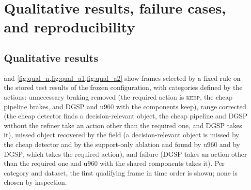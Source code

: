 \documentclass[10pt,letterpaper]{article}
\newcommand{\method}{DGSP\xspace}
\theoremstyle{remark}
\theoremstyle{plain}
\theoremstyle{definition}
\begin{document}
\section{Qualitative results, failure cases, and reproducibility}
\label{sec:supp_qual}

\subsection{Qualitative results}
\label{sec:supp_qualitative}

 and \cref{fig:qual_n,fig:qual_a1,fig:qual_a2} show frames selected by a fixed rule on the stored test results of the frozen configuration, with categories defined by the actions: unnecessary braking removed (the required action is \textsc{keep}, the cheap pipeline brakes, and \method and u960 with the components keep), range corrected (the cheap detector finds a decision-relevant object, the cheap pipeline and \method without the refiner take an action other than the required one, and \method takes it), missed object recovered by the field (a decision-relevant object is missed by the cheap detector and by the support-only ablation and found by u960 and by \method, which takes the required action), and failure (\method takes an action other than the required one and u960 with the shared components takes it).
Per category and dataset, the first qualifying frame in time order is shown; none is chosen by inspection.
\end{document}
